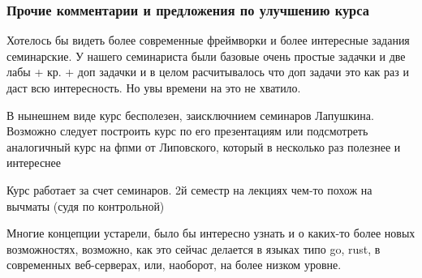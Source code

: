     \subsubsection{Прочие комментарии и предложения по улучшению курса}
            \begin{commentbox}
                Хотелось бы видеть более современные фреймворки и более интересные задания семинарские. У нашего семинариста были базовые очень простые задачки и две лабы + кр. + доп задачки и в целом расчитывалось что доп задачи это как раз и даст всю интересность. Но увы времени на это не хватило.
            \end{commentbox}

            \begin{commentbox}
                В нынешнем виде курс бесполезен, заисключнием семинаров Лапушкина. Возможно следует построить курс по его презентациям или подсмотреть аналогичный курс на фпми от Липовского, который в несколько раз полезнее и интереснее
            \end{commentbox}

            \begin{commentbox}
                Курс работает  за счет семинаров. 2й семестр на лекциях чем-то похож на вычматы (судя по контрольной)
            \end{commentbox}

            \begin{commentbox}
                Многие концепции устарели, было бы интересно узнать и о каких-то более новых возможностях, возможно, как это сейчас делается в языках типо go, rust, в современных веб-серверах, или, наоборот, на более низком уровне.
            \end{commentbox}